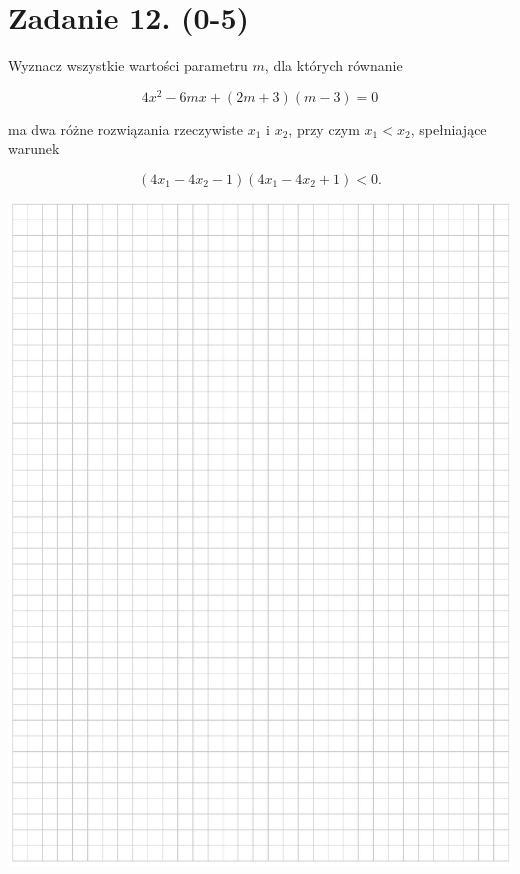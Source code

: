 \documentclass[10pt]{article}
\begin{document}
\section*{Zadanie 12. (0-5)}
Wyznacz wszystkie wartości parametru \(m\), dla których równanie

\[
4 x^{2}-6 m x+(2 m+3)(m-3)=0
\]

ma dwa różne rozwiązania rzeczywiste \(x_{1}\) i \(x_{2}\), przy czym \(x_{1}<x_{2}\), spełniające warunek

\[
\left(4 x_{1}-4 x_{2}-1\right)\left(4 x_{1}-4 x_{2}+1\right)<0 .
\]

\includegraphics[max width=\textwidth, center]{2024_11_21_3120cbc7edd07b3a101fg-10}\\
\end{document}
